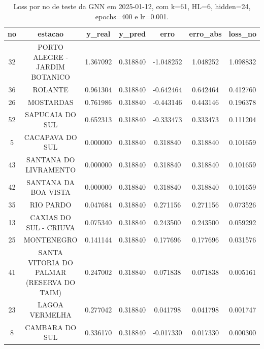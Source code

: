 \begin{table}[h]
\centering
\caption{Loss por no de teste da GNN em 2025-01-12, com k=61, HL=6, hidden=24, epochs=400 e lr=0.001.}
\label{tab:gnn_loss_k61_hl6_h24_e400_d20250112}
\begin{tabular}{ccccccc}
\toprule
no & estacao & y\_real & y\_pred & erro & erro\_abs & loss\_no \\
\midrule
32 & PORTO ALEGRE - JARDIM BOTANICO & 1.367092 & 0.318840 & -1.048252 & 1.048252 & 1.098832 \\
36 & ROLANTE & 0.961304 & 0.318840 & -0.642464 & 0.642464 & 0.412760 \\
26 & MOSTARDAS & 0.761986 & 0.318840 & -0.443146 & 0.443146 & 0.196378 \\
52 & SAPUCAIA DO SUL & 0.652313 & 0.318840 & -0.333473 & 0.333473 & 0.111204 \\
5 & CACAPAVA DO SUL & 0.000000 & 0.318840 & 0.318840 & 0.318840 & 0.101659 \\
43 & SANTANA DO LIVRAMENTO & 0.000000 & 0.318840 & 0.318840 & 0.318840 & 0.101659 \\
42 & SANTANA DA BOA VISTA & 0.000000 & 0.318840 & 0.318840 & 0.318840 & 0.101659 \\
35 & RIO PARDO & 0.047684 & 0.318840 & 0.271156 & 0.271156 & 0.073526 \\
13 & CAXIAS DO SUL - CRIUVA & 0.075340 & 0.318840 & 0.243500 & 0.243500 & 0.059292 \\
25 & MONTENEGRO & 0.141144 & 0.318840 & 0.177696 & 0.177696 & 0.031576 \\
41 & SANTA VITORIA DO PALMAR (RESERVA DO TAIM) & 0.247002 & 0.318840 & 0.071838 & 0.071838 & 0.005161 \\
23 & LAGOA VERMELHA & 0.277042 & 0.318840 & 0.041798 & 0.041798 & 0.001747 \\
8 & CAMBARA DO SUL & 0.336170 & 0.318840 & -0.017330 & 0.017330 & 0.000300 \\
\bottomrule
\end{tabular}
\end{table}
